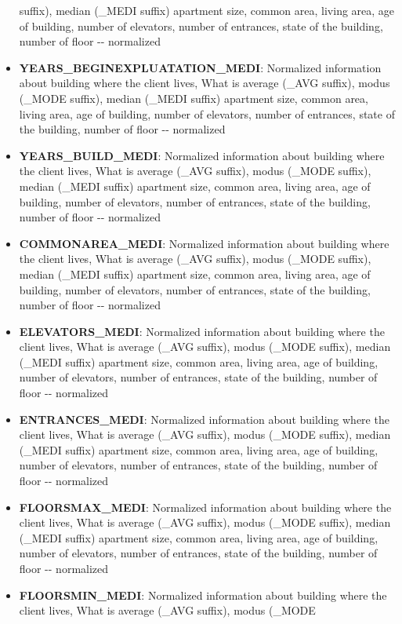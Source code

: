 \documentclass[11pt]{article}
\begin{document}
\begin{itemize}
  suffix), median (\_MEDI suffix) apartment size, common area, living
  area, age of building, number of elevators, number of entrances, state
  of the building, number of floor -\/- normalized
\item
  \textbf{YEARS\_BEGINEXPLUATATION\_MEDI}: Normalized information about
  building where the client lives, What is average (\_AVG suffix), modus
  (\_MODE suffix), median (\_MEDI suffix) apartment size, common area,
  living area, age of building, number of elevators, number of
  entrances, state of the building, number of floor -\/- normalized
\item
  \textbf{YEARS\_BUILD\_MEDI}: Normalized information about building
  where the client lives, What is average (\_AVG suffix), modus (\_MODE
  suffix), median (\_MEDI suffix) apartment size, common area, living
  area, age of building, number of elevators, number of entrances, state
  of the building, number of floor -\/- normalized
\item
  \textbf{COMMONAREA\_MEDI}: Normalized information about building where
  the client lives, What is average (\_AVG suffix), modus (\_MODE
  suffix), median (\_MEDI suffix) apartment size, common area, living
  area, age of building, number of elevators, number of entrances, state
  of the building, number of floor -\/- normalized
\item
  \textbf{ELEVATORS\_MEDI}: Normalized information about building where
  the client lives, What is average (\_AVG suffix), modus (\_MODE
  suffix), median (\_MEDI suffix) apartment size, common area, living
  area, age of building, number of elevators, number of entrances, state
  of the building, number of floor -\/- normalized
\item
  \textbf{ENTRANCES\_MEDI}: Normalized information about building where
  the client lives, What is average (\_AVG suffix), modus (\_MODE
  suffix), median (\_MEDI suffix) apartment size, common area, living
  area, age of building, number of elevators, number of entrances, state
  of the building, number of floor -\/- normalized
\item
  \textbf{FLOORSMAX\_MEDI}: Normalized information about building where
  the client lives, What is average (\_AVG suffix), modus (\_MODE
  suffix), median (\_MEDI suffix) apartment size, common area, living
  area, age of building, number of elevators, number of entrances, state
  of the building, number of floor -\/- normalized
\item
  \textbf{FLOORSMIN\_MEDI}: Normalized information about building where
  the client lives, What is average (\_AVG suffix), modus (\_MODE

\end{itemize}
\end{document}
